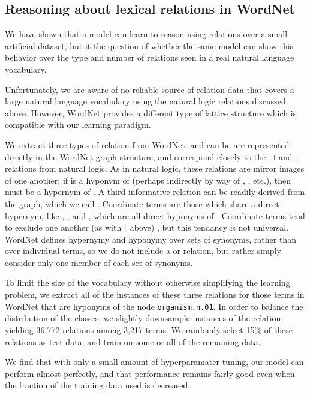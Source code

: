 \subsection*{Reasoning about lexical relations in WordNet}\label{sec:wordnet}

We have shown that a model can learn to reason using relations over a small artificial dataset, 
but it the question of whether the same model can show this behavior over the type and number of
relations seen in a real natural language vocabulary.

Unfortunately, we are aware of no reliable source of relation data that covers a large natural 
language vocabulary using the natural logic relations discussed above. However, WordNet 
\cite{fellbaum2010wordnet} provides a different type of lattice structure which is compatible with
our learning paradigm.

We extract three types of relation from WordNet.  and  can be are represented
directly in the WordNet graph structure, and correspond closely to the $\sqsupset$ and $\sqsubset$ relations from
natural logic. As in natural logic, these relations are mirror images of one another: if  is a
hyponym of  (perhaps indirectly by way of , , etc.), then  must be a 
hypernym of . A third informative relation can 
be readily derived from the graph, which we call . Coordinate terms are those which share
a direct hypernym, like , , and , which are all direct hyponyms of . 
Coordinate terms tend to exclude one another (as with $\mathbin{|}$ above) \cite{Hurford:1974}, but this tendancy
is not universal. WordNet defines hypernymy and hyponymy over sets of synonyms, rather than over individual 
terms, so we do not include a  or  relation, but rather simply consider only one
member of each set of synonyms.

To limit the size of the vocabulary without otherwise simplifying the learning problem, we extract all of the
instances of these three relations for those terms in WordNet that are hyponyms of the node \texttt{organism.n.01}.
In order to balance the distribution of the classes, we slightly downsample instances of the  relation,
yielding 36,772 relations among 3,217 terms. We randomly select 15\% of these relations as test data, and train on
some or all of the remaining data.

We find that with only a small amount of hyperparamater tuning, our model can perform almost perfectly, and that performance remains fairly good even when the fraction of the training data used is decreased. 

